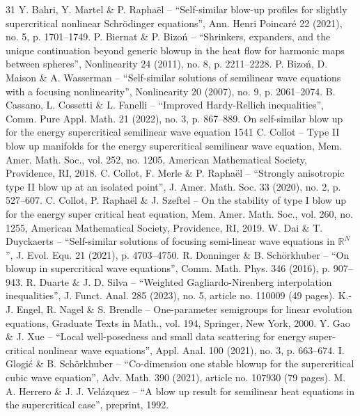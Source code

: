 \begin{thebibliography}{31}
 Y. Bahri, Y. Martel \& P. Raphaël – “Self-similar blow-up profiles for slightly supercritical nonlinear Schrödinger equations”, Ann. Henri Poincaré 22 (2021), no. 5, p. 1701–1749.
 P. Biernat \& P. Bizoń – “Shrinkers, expanders, and the unique continuation beyond generic blowup in the heat flow for harmonic maps between spheres”, Nonlinearity 24 (2011), no. 8, p. 2211–2228.
 P. Bizoń, D. Maison \& A. Wasserman – “Self-similar solutions of semilinear wave equations with a focusing nonlinearity”, Nonlinearity 20 (2007), no. 9, p. 2061–2074.
 B. Cassano, L. Cossetti \& L. Fanelli – “Improved Hardy-Rellich inequalities”, Comm. Pure Appl. Math. 21 (2022), no. 3, p. 867–889. On self-similar blow up for the energy supercritical semilinear wave equation              1541
 C. Collot – Type II blow up manifolds for the energy supercritical semilinear wave equation, Mem. Amer. Math. Soc., vol. 252, no. 1205, American Mathematical Society, Providence, RI, 2018.
 C. Collot, F. Merle \& P. Raphaël – “Strongly anisotropic type II blow up at an isolated point”, J. Amer. Math. Soc. 33 (2020), no. 2, p. 527–607.
 C. Collot, P. Raphaël \& J. Szeftel – On the stability of type I blow up for the energy super critical heat equation, Mem. Amer. Math. Soc., vol. 260, no. 1255, American Mathematical Society, Providence, RI, 2019.
 W. Dai \& T. Duyckaerts – “Self-similar solutions of focusing semi-linear wave equations in $\mathbb R^N$ ”, J. Evol. Equ. 21 (2021), p. 4703–4750.
 R. Donninger \& B. Schörkhuber – “On blowup in supercritical wave equations”, Comm. Math. Phys. 346 (2016), p. 907–943.
 R. Duarte \& J. D. Silva – “Weighted Gagliardo-Nirenberg interpolation inequalities”, J. Funct. Anal. 285 (2023), no. 5, article no. 110009 (49 pages).
 K.-J. Engel, R. Nagel \& S. Brendle – One-parameter semigroups for linear evolution equations, Graduate Texts in Math., vol. 194, Springer, New York, 2000.
 Y. Gao \& J. Xue – “Local well-posedness and small data scattering for energy super-critical nonlinear wave equations”, Appl. Anal. 100 (2021), no. 3, p. 663–674.
 I. Glogić \& B. Schörkhuber – “Co-dimension one stable blowup for the supercritical cubic wave equation”, Adv. Math. 390 (2021), article no. 107930 (79 pages).
 M. A. Herrero \& J. J. Velázquez – “A blow up result for semilinear heat equations in the supercritical case”, preprint, 1992.

\end{thebibliography}
